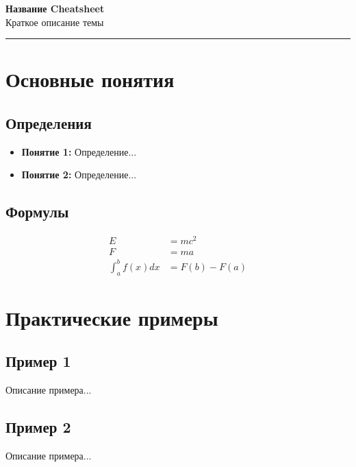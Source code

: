 \documentclass[10pt,landscape,a4paper]{article}
\begin{document}
\begin{center}
    {\Huge\bfseries Название Cheatsheet}\\[0.5cm]
    {\large Краткое описание темы}\\[0.3cm]
    \vspace{0.3cm}
    \rule{\textwidth}{1pt}
\end{center}

\providecommand{\contributors}{}

\begin{multicols}{2}

\section{Основные понятия}

\subsection{Определения}
\begin{itemize}
    \item \textbf{Понятие 1:} Определение...
    \item \textbf{Понятие 2:} Определение...
\end{itemize}

\subsection{Формулы}
\begin{align}
    E &= mc^2 \\
    F &= ma \\
    \int_a^b f(x) dx &= F(b) - F(a)
\end{align}

\section{Практические примеры}

\subsection{Пример 1}
Описание примера...

\subsection{Пример 2}
Описание примера...


\end{multicols}
\end{document}

